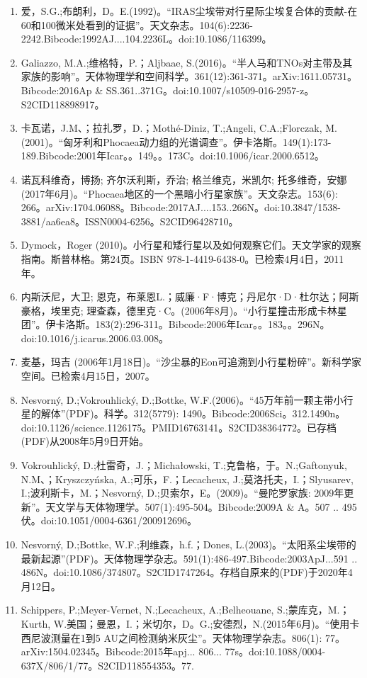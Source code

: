 \begin{enumerate}
\item 爱，S.G.;布朗利，D。E.(1992)。“IRAS尘埃带对行星际尘埃复合体的贡献-在60和100微米处看到的证据”。天文杂志。104(6):2236-2242.Bibcode:1992AJ....104.2236L。doi:10.1086/116399。
\item Galiazzo, M.A.;维格特，P.；Aljbaae, S.(2016)。“半人马和TNOs对主带及其家族的影响”。天体物理学和空间科学。361(12):361-371。arXiv:1611.05731。Bibcode:2016Ap & SS.361..371G。doi:10.1007/s10509-016-2957-z。S2CID118898917。 
\item 卡瓦诺，J.M、；拉扎罗，D.；Mothé-Diniz, T.;Angeli, C.A.;Florczak, M.(2001)。“匈牙利和Phocaea动力组的光谱调查”。伊卡洛斯。149(1):173-189.Bibcode:2001年Icar。。149。。173C。doi:10.1006/icar.2000.6512。
\item 诺瓦科维奇，博扬; 齐尔沃利斯，乔治; 格兰维克，米凯尔; 托多维奇，安娜 (2017年6月)。“Phocaea地区的一个黑暗小行星家族”。天文杂志。153(6): 266。arXiv:1704.06088。Bibcode:2017AJ....153..266N。doi:10.3847/1538-3881/aa6ea8。ISSN0004-6256。S2CID96428710。  
\item Dymock，Roger (2010)。小行星和矮行星以及如何观察它们。天文学家的观察指南。斯普林格。第24页。ISBN 978-1-4419-6438-0。已检索4月4日，2011年。
\item 内斯沃尼，大卫; 恩克，布莱恩L.；威廉·F·博克；丹尼尔·D·杜尔达；阿斯豪格，埃里克; 理查森，德里克·C。(2006年8月)。“小行星撞击形成卡林星团”。伊卡洛斯。183(2):296-311。Bibcode:2006年Icar。。183。。296N。doi:10.1016/j.icarus.2006.03.008。
\item 麦基，玛吉 (2006年1月18日)。“沙尘暴的Eon可追溯到小行星粉碎”。新科学家空间。已检索4月15日，2007。
\item Nesvorný, D.;Vokrouhlický, D.;Bottke, W.F.(2006)。“45万年前一颗主带小行星的解体”(PDF)。科学。312(5779): 1490。Bibcode:2006Sci。312.1490n。doi:10.1126/science.1126175。PMID16763141。S2CID38364772。已存档(PDF)从2008年5月9日开始。   
\item Vokrouhlický, D.;杜雷奇，J.；Michałowski, T.;克鲁格，于。N.;Gaftonyuk, N.M、；Kryszczyńska, A.;可乐，F.；Lecacheux, J.;莫洛托夫，I.；Slyusarev, I.;波利斯卡，M.；Nesvorný, D.;贝索尔，E。(2009)。“曼陀罗家族: 2009年更新”。天文学与天体物理学。507(1):495-504。Bibcode:2009A & A。507 .. 495伏。doi:10.1051/0004-6361/200912696。
\item Nesvorný, D.;Bottke, W.F.;利维森，h.f.；Dones, L.(2003)。“太阳系尘埃带的最新起源”(PDF)。天体物理学杂志。591(1):486-497.Bibcode:2003ApJ...591 .. 486N。doi:10.1086/374807。S2CID1747264。存档自原来的(PDF)于2020年4月12日。  
\item Schippers, P.;Meyer-Vernet, N.;Lecacheux, A.;Belheouane, S.;蒙库克，M.；Kurth, W.美国；曼恩，I.；米切尔，D。G.;安德烈，N.(2015年6月)。“使用卡西尼波测量在1到5 AU之间检测纳米灰尘”。天体物理学杂志。806(1): 77。arXiv:1504.02345。Bibcode:2015年apj... 806... 77s。doi:10.1088/0004-637X/806/1/77。S2CID118554353。77. 

\end{enumerate}
